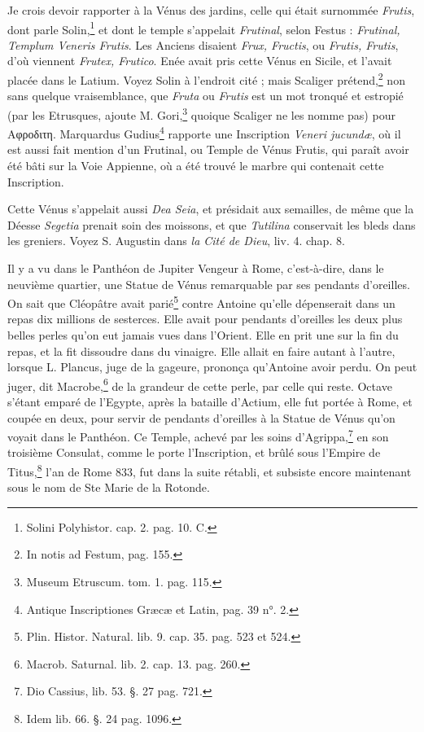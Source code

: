 \documentclass[a4paper, 18pt, oneside]{article}
\begin{document}
Je crois devoir rapporter à la Vénus des jardins, celle qui était surnommée \emph{Frutis}, dont parle Solin,\footnote{Solini Polyhistor. cap. 2. pag. 10. C.} et dont le temple s'appelait \emph{Frutinal}, selon Festus : \emph{Frutinal, Templum Veneris Frutis}. Les Anciens disaient \emph{Frux, Fructis}, ou \emph{Frutis, Frutis}, d'où viennent \emph{Frutex, Frutico}. Enée avait pris cette Vénus en Sicile, et l'avait placée dans le Latium. Voyez Solin à l'endroit cité ; mais Scaliger prétend,\footnote{In notis ad Festum, pag. 155.} non sans quelque vraisemblance, que \emph{Fruta} ou \emph{Frutis} est un mot tronqué et estropié (par les Etrusques, ajoute M. Gori,\footnote{Museum Etruscum. tom. 1. pag. 115.} quoique Scaliger ne les nomme pas) pour Αφροδιτη. Marquardus Gudius\footnote{Antique Inscriptiones Græcæ et Latin, pag. 39 n°. 2.} rapporte une Inscription \emph{Veneri jucundæ}, où il est aussi fait mention d'un Frutinal, ou Temple de Vénus Frutis, qui paraît avoir été bâti sur la Voie Appienne, où a été trouvé le marbre qui contenait cette Inscription.

Cette Vénus s'appelait aussi \emph{Dea Seia}, et présidait aux semailles, de même que la Déesse \emph{Segetia} prenait soin des moissons, et que \emph{Tutilina} conservait les bleds dans les greniers. Voyez S. Augustin dans \emph{la Cité de Dieu}, liv. 4. chap. 8.

Il y a vu dans le Panthéon de Jupiter Vengeur à Rome, c'est-à-dire, dans le neuvième quartier, une Statue de Vénus remarquable par ses pendants d'oreilles. On sait que Cléopâtre avait parié\footnote{Plin. Histor. Natural. lib. 9. cap. 35. pag. 523 et 524.} contre Antoine qu'elle dépenserait dans un repas dix millions de sesterces. Elle avait pour pendants d'oreilles les deux plus belles perles qu'on eut jamais vues dans l'Orient. Elle en prit une sur la fin du repas, et la fit dissoudre dans du vinaigre. Elle allait en faire autant à l'autre, lorsque L. Plancus, juge de la gageure, prononça qu'Antoine avoir perdu. On peut juger, dit Macrobe,\footnote{Macrob. Saturnal. lib. 2. cap. 13. pag. 260.} de la grandeur de cette perle, par celle qui reste. Octave s'étant emparé de l'Egypte, après la bataille d'Actium, elle fut portée à Rome, et coupée en deux, pour servir de pendants d'oreilles à la Statue de Vénus qu'on voyait dans le Panthéon. Ce Temple, achevé par les soins d'Agrippa,\footnote{Dio Cassius, lib. 53. §. 27 pag. 721.} en son troisième Consulat, comme le porte l'Inscription, et brûlé sous l'Empire de Titus,\footnote{Idem lib. 66. §. 24 pag. 1096.} l'an de Rome 833, fut dans la suite rétabli, et subsiste encore maintenant sous le nom de Ste Marie de la Rotonde.
\end{document}
